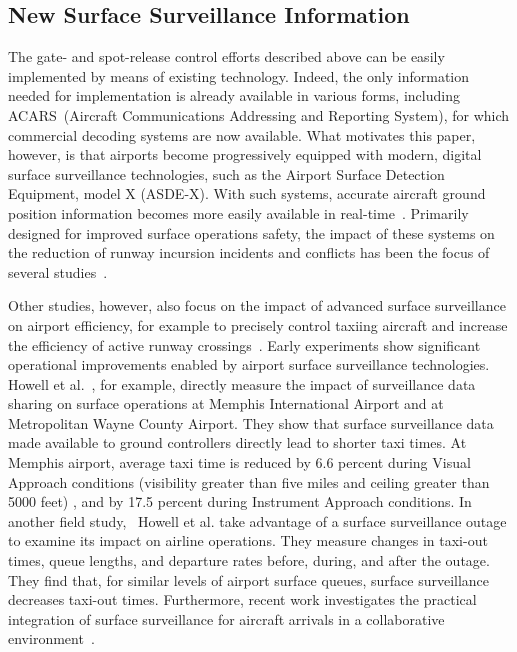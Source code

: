 \documentclass[letterpaper]{article}
\begin{document}
\subsection{New Surface Surveillance Information}
The gate- and spot-release control efforts described above can be easily implemented by means of existing technology. Indeed, the only information needed for implementation is already available in various forms, including ACARS~(Aircraft Communications Addressing and Reporting System), for which commercial decoding systems are now available. What motivates this paper, however, is that airports become progressively equipped with modern, digital surface surveillance technologies, such as the Airport Surface Detection Equipment, model X (ASDE-X). With such systems, accurate aircraft ground position information becomes more easily available in real-time~\cite{Eurocontrol2008,Aviation2009,Besada2004,Dimitropoulos2007}. Primarily designed for improved surface operations safety, the impact of these systems on the reduction of runway incursion incidents and conflicts has been the focus of several studies~\cite{Young2000,Singh2004,Schofield2008}.

Other studies, however, also focus on the impact of advanced surface surveillance on airport efficiency, for example
to precisely control taxiing aircraft and increase the efficiency of active runway crossings~\cite{Cheng2001}.
Early experiments show significant operational improvements enabled by airport surface surveillance technologies.
Howell et al.~\cite{Howell2004}, for example, directly measure the impact of surveillance data sharing on surface operations at Memphis International Airport and at Metropolitan Wayne County Airport. They show
that surface surveillance data made available to ground controllers directly lead to shorter taxi times.
At Memphis airport, average taxi time is reduced by 6.6 percent during Visual Approach conditions (visibility greater than five miles and ceiling greater than 5000 feet) , and by 17.5 percent during Instrument Approach conditions.
In another field study,~\cite{Howell2005} Howell et al. take advantage of a surface surveillance outage to examine its impact on airline operations.
They measure changes in taxi-out times, queue lengths, and departure rates before, during, and after the outage. They find that, for similar levels
of airport surface queues, surface surveillance decreases taxi-out times.
Furthermore, recent work investigates the practical integration
of surface surveillance for aircraft arrivals in a collaborative
environment~\cite{Andersson2003,Jung2005,Hughes2006}.
\end{document}
